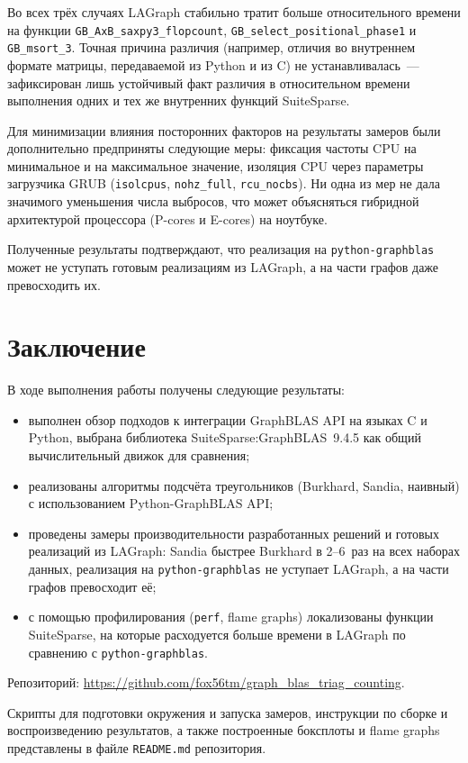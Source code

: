 \documentclass[a4paper]{article}
\begin{document}
Во всех трёх случаях LAGraph стабильно тратит больше относительного времени на функции \texttt{GB\_AxB\_sax\-py3\_flop\-count}, \texttt{GB\_select\_posi\-ti\-o\-nal\_pha\-se1} и \texttt{GB\_msort\_3}.
Точная причина различия (например, отличия во внутреннем формате матрицы, передаваемой из Python и из C) не уста\-нав\-ли\-ва\-лась~--- зафиксирован лишь устойчивый факт различия в относительном времени выполнения одних и тех же внутренних функций SuiteSparse.

Для минимизации влияния посторонних факторов на результаты замеров были дополнительно предприняты следующие меры: фиксация частоты CPU на минимальное и на максимальное значение, изоляция CPU через параметры загрузчика GRUB (\texttt{isolcpus}, \texttt{nohz\_full}, \texttt{rcu\_nocbs}).
Ни одна из мер не дала значимого уменьшения числа выбросов, что может объясняться гибридной архитектурой процессора (P-cores и E-cores) на ноутбуке.

Полученные результаты подтверждают, что реализация на \texttt{python-graphblas} может не уступать готовым реализациям из LAGraph, а на части графов даже превосходить их.

\section{Заключение}

В ходе выполнения работы получены следующие результаты:

\begin{itemize}
    \item выполнен обзор подходов к интеграции GraphBLAS API на языках C и Python, выбрана библиотека SuiteSparse:GraphBLAS~9.4.5 как общий вычислительный движок для сравнения;
    \item реализованы алгоритмы подсчёта треугольников (Burkhard, Sandia, наивный) с использованием Python-GraphBLAS API;
    \item проведены замеры производительности разработанных решений и готовых реализаций из LAGraph: Sandia быстрее Burkhard в 2--6~раз на всех наборах данных, реализация на \texttt{python-graphblas} не уступает LAGraph, а на части графов превосходит её;
    \item с помощью профилирования (\texttt{perf}, flame graphs) локализованы функции SuiteSparse, на которые расходуется больше времени в LAGraph по сравнению с \texttt{python-graphblas}.
\end{itemize}

Репозиторий: \url{https://github.com/fox56tm/graph_blas_triag_counting}.

Скрипты для подготовки окружения и запуска замеров, инструкции по сборке и воспроизведению результатов, а также построенные боксплоты и flame graphs представлены в файле \texttt{README.md} репозитория.
\end{document}

